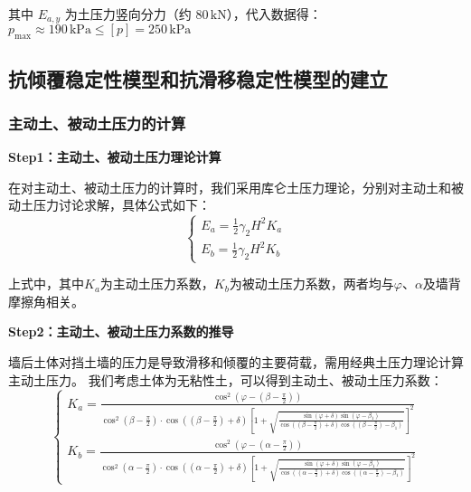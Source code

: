 \documentclass[withoutpreface,bwprint]{cumcmthesis}
\begin{document}
其中 $E_{a,y}$ 为土压力竖向分力（约 $80 \, \text{kN}$），代入数据得：$p_{\text{max}} \approx 190 \, \text{kPa} \leq [p] = 250 \, \text{kPa} $

\subsection{抗倾覆稳定性模型和抗滑移稳定性模型的建立}

\subsubsection{主动土、被动土压力的计算}

\textbf{Step1：主动土、被动土压力理论计算} 
\par
在对主动土、被动土压力的计算时，我们采用库仑土压力理论，分别对主动土和被动土压力讨论求解，具体公式如下：
    \begin{equation}
        \left\{
            \begin{aligned}
                E_a=\frac{1}{2} \gamma_2 H^2K_a\\
                E_b=\frac{1}{2} \gamma_2 H^2K_b
            \end{aligned}
        \right.
    \end{equation}
\par
    上式中，其中$K_a$为主动土压力系数，$K_b$为被动土压力系数，两者均与$\varphi$、$\alpha$及墙背摩擦角相关。

\textbf{Step2：主动土、被动土压力系数的推导} 
\par
    墙后土体对挡土墙的压力是导致滑移和倾覆的主要荷载，需用经典土压力理论计算主动土压力。
    我们考虑土体为无粘性土，可以得到主动土、被动土压力系数：
    \begin{equation}
            \left\{
            \begin{aligned}
                K_a=\frac{\cos^2(\varphi-(\beta-\frac{\pi}{2}))}{\cos^2(\beta-\frac{\pi}{2})\cdot\cos((\beta-\frac{\pi}{2})+\delta)\left[1+\sqrt{\frac{\sin(\varphi+\delta)\sin(\varphi-\beta_1)}{\cos((\beta-\frac{\pi}{2})+\delta)\cos((\beta-\frac{\pi}{2})-\beta_1)}}\right]^2}\\
                K_b=\frac{\cos^2(\varphi-(\alpha-\frac{\pi}{2}))}{\cos^2(\alpha-\frac{\pi}{2})\cdot\cos((\alpha-\frac{\pi}{2})+\delta)\left[1+\sqrt{\frac{\sin(\varphi+\delta)\sin(\varphi-\beta_1)}{\cos((\alpha-\frac{\pi}{2})+\delta)\cos((\alpha-\frac{\pi}{2})-\beta_1)}}\right]^2}
            \end{aligned}
            \right.
    \end{equation}
    
\end{document}
